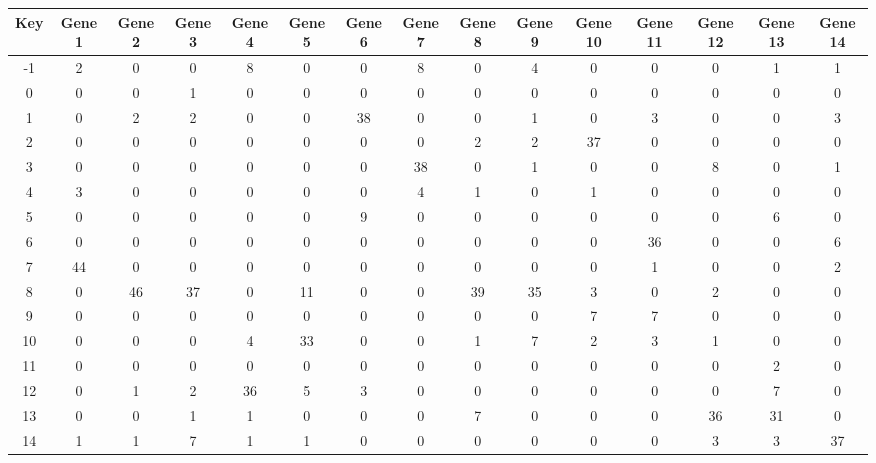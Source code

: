 \begin{tabular}{|c|c|c|c|c|c|c|c|c|c|c|c|c|c|c|}
\hline
Key & Gene 1 & Gene 2 & Gene 3 & Gene 4 & Gene 5 & Gene 6 & Gene 7 & Gene 8 & Gene 9 & Gene 10 & Gene 11 & Gene 12 & Gene 13 & Gene 14 \\
\hline
-1 & 2 & 0 & 0 & 8 & 0 & 0 & 8 & 0 & 4 & 0 & 0 & 0 & 1 & 1 \\
0 & 0 & 0 & 1 & 0 & 0 & 0 & 0 & 0 & 0 & 0 & 0 & 0 & 0 & 0 \\
1 & 0 & 2 & 2 & 0 & 0 & 38 & 0 & 0 & 1 & 0 & 3 & 0 & 0 & 3 \\
2 & 0 & 0 & 0 & 0 & 0 & 0 & 0 & 2 & 2 & 37 & 0 & 0 & 0 & 0 \\
3 & 0 & 0 & 0 & 0 & 0 & 0 & 38 & 0 & 1 & 0 & 0 & 8 & 0 & 1 \\
4 & 3 & 0 & 0 & 0 & 0 & 0 & 4 & 1 & 0 & 1 & 0 & 0 & 0 & 0 \\
5 & 0 & 0 & 0 & 0 & 0 & 9 & 0 & 0 & 0 & 0 & 0 & 0 & 6 & 0 \\
6 & 0 & 0 & 0 & 0 & 0 & 0 & 0 & 0 & 0 & 0 & 36 & 0 & 0 & 6 \\
7 & 44 & 0 & 0 & 0 & 0 & 0 & 0 & 0 & 0 & 0 & 1 & 0 & 0 & 2 \\
8 & 0 & 46 & 37 & 0 & 11 & 0 & 0 & 39 & 35 & 3 & 0 & 2 & 0 & 0 \\
9 & 0 & 0 & 0 & 0 & 0 & 0 & 0 & 0 & 0 & 7 & 7 & 0 & 0 & 0 \\
10 & 0 & 0 & 0 & 4 & 33 & 0 & 0 & 1 & 7 & 2 & 3 & 1 & 0 & 0 \\
11 & 0 & 0 & 0 & 0 & 0 & 0 & 0 & 0 & 0 & 0 & 0 & 0 & 2 & 0 \\
12 & 0 & 1 & 2 & 36 & 5 & 3 & 0 & 0 & 0 & 0 & 0 & 0 & 7 & 0 \\
13 & 0 & 0 & 1 & 1 & 0 & 0 & 0 & 7 & 0 & 0 & 0 & 36 & 31 & 0 \\
14 & 1 & 1 & 7 & 1 & 1 & 0 & 0 & 0 & 0 & 0 & 0 & 3 & 3 & 37 \\
\hline
\end{tabular}